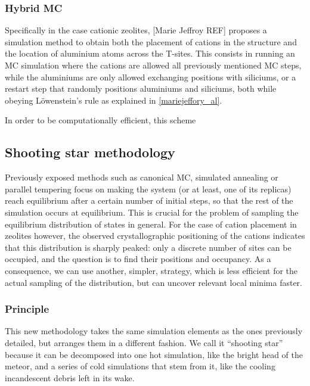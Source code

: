 \documentclass[main.tex]{subfiles}
\begin{document}
\subsubsection{Hybrid MC} %

Specifically in the case cationic zeolites, [Marie Jeffroy REF] proposes a simulation method to obtain both the placement of cations in the structure and the location of aluminium atoms across the T-sites. This consists in running an MC simulation where the cations are allowed all previously mentioned MC steps, while the aluminiums are only allowed exchanging positions with siliciums, or a restart step that randomly positions aluminiums and siliciums, both while obeying L\"owenstein's rule as explained in \autoref{mariejeffory_al}.

In order to be computationally efficient, this scheme 

\subsection{Shooting star methodology}

Previously exposed methods such as canonical MC, simulated annealing or parallel tempering focus on making the system (or at least, one of its replicas) reach equilibrium after a certain number of initial steps, so that the rest of the simulation occurs at equilibrium. This is crucial for the problem of sampling the equilibrium distribution of states in general. For the case of cation placement in zeolites however, the observed crystallographic positioning of the cations indicates that this distribution is sharply peaked: only a discrete number of sites can be occupied, and the question is to find their positions and occupancy. As a consequence, we can use another, simpler, strategy, which is less efficient for the actual sampling of the distribution, but can uncover relevant local minima faster.

\subsubsection{Principle}

This new methodology takes the same simulation elements as the ones previously detailed, but arranges them in a different fashion. We call it ``shooting star'' because it can be decomposed into one hot simulation, like the bright head of the meteor, and a series of cold simulations that stem from it, like the cooling incandescent debris left in its wake.
\end{document}

